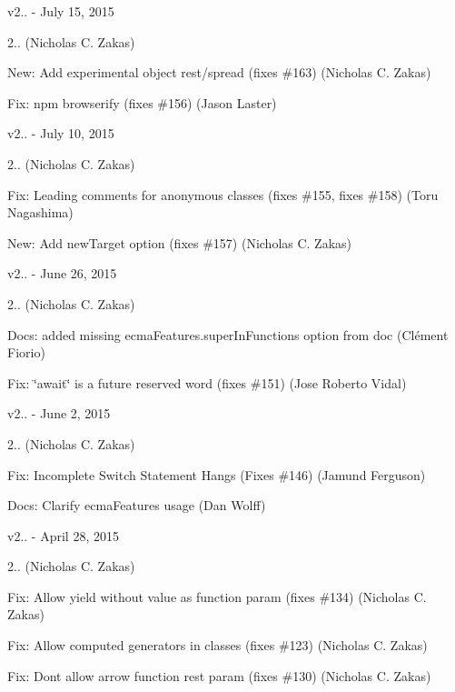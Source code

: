 v2.. -\/ July 15, 2015


\begin{DoxyItemize}
\item 2.. (Nicholas C. Zakas)
\item New\+: Add experimental object rest/spread (fixes \#163) (Nicholas C. Zakas)
\item Fix\+: npm browserify (fixes \#156) (Jason Laster)
\end{DoxyItemize}

v2.. -\/ July 10, 2015


\begin{DoxyItemize}
\item 2.. (Nicholas C. Zakas)
\item Fix\+: Leading comments for anonymous classes (fixes \#155, fixes \#158) (Toru Nagashima)
\item New\+: Add new\+Target option (fixes \#157) (Nicholas C. Zakas)
\end{DoxyItemize}

v2.. -\/ June 26, 2015


\begin{DoxyItemize}
\item 2.. (Nicholas C. Zakas)
\item Docs\+: added missing {\ttfamily ecma\+Features.\+super\+In\+Functions} option from doc (Clément Fiorio)
\item Fix\+: \char`\"{}await\char`\"{} is a future reserved word (fixes \#151) (Jose Roberto Vidal)
\end{DoxyItemize}

v2.. -\/ June 2, 2015


\begin{DoxyItemize}
\item 2.. (Nicholas C. Zakas)
\item Fix\+: Incomplete Switch Statement Hangs (Fixes \#146) (Jamund Ferguson)
\item Docs\+: Clarify ecma\+Features usage (Dan Wolff)
\end{DoxyItemize}

v2.. -\/ April 28, 2015


\begin{DoxyItemize}
\item 2.. (Nicholas C. Zakas)
\item Fix\+: Allow yield without value as function param (fixes \#134) (Nicholas C. Zakas)
\item Fix\+: Allow computed generators in classes (fixes \#123) (Nicholas C. Zakas)
\item Fix\+: Don\textquotesingle{}t allow arrow function rest param (fixes \#130) (Nicholas C. Zakas)
\end{DoxyItemize}

